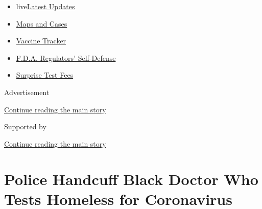 \begin{itemize}
\tightlist
\item
  live\href{https://www.nytimes3xbfgragh.onion/2020/09/11/world/covid-19-coronavirus.html?name=styln-coronavirus-national\&region=TOP_BANNER\&block=storyline_menu_recirc\&action=click\&pgtype=Article\&impression_id=55c869f1-f4bf-11ea-9dac-9b804d637ca6\&variant=undefined}{Latest
  Updates}
\item
  \href{https://www.nytimes3xbfgragh.onion/interactive/2020/us/coronavirus-us-cases.html?name=styln-coronavirus-national\&region=TOP_BANNER\&block=storyline_menu_recirc\&action=click\&pgtype=Article\&impression_id=55c869f2-f4bf-11ea-9dac-9b804d637ca6\&variant=undefined}{Maps
  and Cases}
\item
  \href{https://www.nytimes3xbfgragh.onion/interactive/2020/science/coronavirus-vaccine-tracker.html?name=styln-coronavirus-national\&region=TOP_BANNER\&block=storyline_menu_recirc\&action=click\&pgtype=Article\&impression_id=55c869f3-f4bf-11ea-9dac-9b804d637ca6\&variant=undefined}{Vaccine
  Tracker}
\item
  \href{https://www.nytimes3xbfgragh.onion/2020/09/10/us/politics/fda-coronavirus-vaccine.html?name=styln-coronavirus-national\&region=TOP_BANNER\&block=storyline_menu_recirc\&action=click\&pgtype=Article\&impression_id=55c869f4-f4bf-11ea-9dac-9b804d637ca6\&variant=undefined}{F.D.A.
  Regulators' Self-Defense}
\item
  \href{https://www.nytimes3xbfgragh.onion/2020/09/09/upshot/coronavirus-surprise-test-fees.html?name=styln-coronavirus-national\&region=TOP_BANNER\&block=storyline_menu_recirc\&action=click\&pgtype=Article\&impression_id=55c869f5-f4bf-11ea-9dac-9b804d637ca6\&variant=undefined}{Surprise
  Test Fees}
\end{itemize}

Advertisement

\protect\hyperlink{after-top}{Continue reading the main story}

Supported by

\protect\hyperlink{after-sponsor}{Continue reading the main story}

\hypertarget{police-handcuff-black-doctor-who-tests-homeless-for-coronavirus}{%
\section{Police Handcuff Black Doctor Who Tests Homeless for
Coronavirus}\label{police-handcuff-black-doctor-who-tests-homeless-for-coronavirus}}

